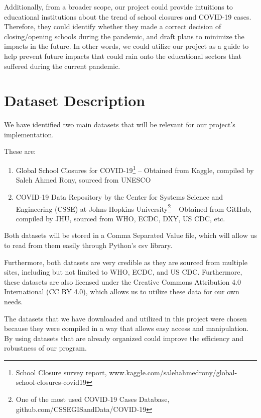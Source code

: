 \documentclass[fontsize=11pt]{article}
\begin{document}
    Additionally, from a broader scope, our project could provide intuitions to educational institutions about the trend of school closures and COVID-19 cases. Therefore, they could identify whether they made a correct decision of closing/opening schools during the pandemic, and draft plans to minimize the impacts in the future. In other words, we could utilize our project as a guide to help prevent future impacts that could rain onto the educational sectors that suffered during the current pandemic.

    \newpage

    \section{Dataset Description}

    We have identified two main datasets that will be relevant for our project’s implementation.

    These are:

    \begin{enumerate}
        \item
        Global School Closures for COVID-19\footnote{School Closure survey report, www.kaggle.com/salehahmedrony/global-school-closures-covid19} – Obtained from Kaggle, compiled by Saleh Ahmed Rony, sourced from UNESCO

        \item
        COVID-19 Data Repository by the Center for Systems Science and Engineering (CSSE) at Johns Hopkins University\footnote{One of the most used COVID-19 Cases Database, github.com/CSSEGISandData/COVID-19} – Obtained from GitHub, compiled by JHU, sourced from WHO, ECDC, DXY, US CDC, etc.
    \end{enumerate}

    Both datasets will be stored in a Comma Separated Value file, which will allow us to read from them easily through Python’s csv library.

    Furthermore, both datasets are very credible as they are sourced from multiple sites, including but not limited to WHO, ECDC, and US CDC. Furthermore, these datasets are also licensed under the Creative Commons Attribution 4.0 International (CC BY 4.0), which allows us to utilize these data for our own needs.

    The datasets that we have downloaded and utilized in this project were chosen because they were compiled in a way that allows easy access and manipulation. By using datasets that are already organized could improve the efficiency and robustness of our program.
\end{document}
